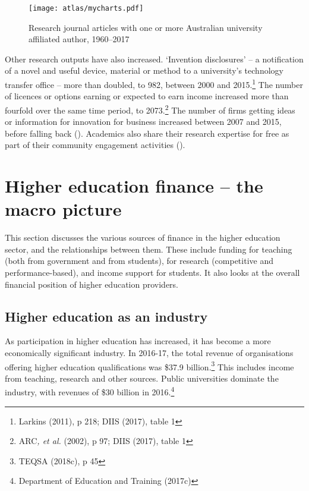 \documentclass{grattan}
\begin{document}
    \begin{figure} %
    \caption{Research journal articles with one or more Australian university affiliated author, 1960--2017}\label{fig:research-journal-articles-with-one-or-more-australian-university-affiliated-author-19602017}
    \texttt{[image: atlas/mycharts.pdf]}
    \end{figure}
Other research outputs have also increased. `Invention disclosures' -- a notification of a novel and useful device, material or method to a university's technology transfer office -- more than doubled, to 982, between 2000 and 2015.\footnote{Larkins (2011), p 218; DIIS (2017), table 1} The number of licences or options earning or expected to earn income increased more than fourfold over the same time period, to 2073.\footnote{ARC\emph{, et al.} (2002), p 97; DIIS (2017), table 1} The number of firms getting ideas or information for innovation for business increased between 2007 and 2015, before falling back (). Academics also share their research expertise for free as part of their community engagement activities ().

%
\chapter{Higher education finance -- the macro picture}\label{chap:higher-education-finance-the-macro-picture}

%


This section discusses the various sources of finance in the higher education sector, and the relationships between them. These include funding for teaching (both from government and from students), for research (competitive and performance-based), and income support for students. It also looks at the overall financial position of higher education providers.

%
\section{Higher education as an industry}\label{sec:higher-education-as-an-industry}

As participation in higher education has increased, it has become a more economically significant industry. In 2016-17, the total revenue of organisations offering higher education qualifications was \$37.9 billion.\footnote{TEQSA (2018c), p 45} This includes income from teaching, research and other sources. Public universities dominate the industry, with revenues of \$30 billion in 2016.\footnote{Department of Education and Training (2017c)}
\end{document}

